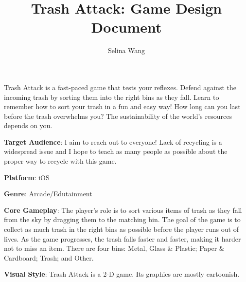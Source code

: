 \documentclass[11pt]{article}
\begin{document}
\title{Trash Attack: Game Design Document}
\author{Selina Wang}
\date{}

\maketitle


Trash Attack is a fast-paced game that tests your reflexes. Defend against the incoming trash by sorting them into the right bins as they fall. Learn to remember how to sort your trash in a fun and easy way! How long can you last before the trash overwhelms you? The sustainability of the world's resources depends on you. 

\vspace{3 mm}

\textbf{Target Audience}: I aim to reach out to everyone! Lack of recycling is a widespread issue and I hope to teach as many people as possible about the proper way to recycle with this game. 

\vspace{3 mm}

\textbf{Platform}: iOS

\vspace{3 mm}


\textbf{Genre}: Arcade/Edutainment
\vspace{3 mm}


\textbf{Core Gameplay}: The player's role is to sort various items of trash as they fall from the sky by dragging them to the matching bin. The goal of the game is to collect as much trash in the right bins as possible before the player runs out of lives. As the game progresses, the trash falls faster and faster, making it harder not to miss an item. There are four bins: Metal, Glass \& Plastic; Paper \& Cardboard; Trash; and Other. 

\vspace{3 mm}

\textbf{Visual Style}: Trash Attack is a 2-D game. Its graphics are mostly cartoonish. 
\end{document}
